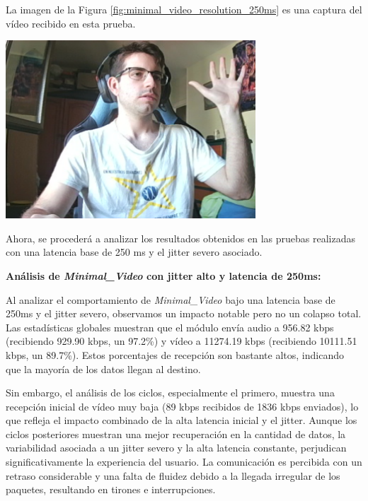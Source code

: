 \newpage
La imagen de la Figura \ref{fig:minimal_video_resolution_250ms} es una captura del vídeo recibido en esta prueba.
\begin{center}
  \includegraphics[width = 0.7\textwidth]{images/VideoRecibido6.3.png}
  \label{fig:minimal_video_resolution_250ms}
\end{center}
\newpage


Ahora, se procederá a analizar los resultados obtenidos en las pruebas realizadas con una latencia base de 250 ms y el jitter severo asociado.
\vspace{\baselineskip}

\textbf{Análisis de \textit{Minimal\_Video} con jitter alto y latencia de 250ms:}
\vspace{\baselineskip}

Al analizar el comportamiento de \textit{Minimal\_Video} bajo una latencia base de 250ms y el jitter severo, observamos un impacto notable pero no un colapso total. Las estadísticas globales muestran que el módulo envía audio a 956.82 kbps (recibiendo 929.90 kbps, un 97.2\%) y vídeo a 11274.19 kbps (recibiendo 10111.51 kbps, un 89.7\%). Estos porcentajes de recepción son bastante altos, indicando que la mayoría de los datos llegan al destino.
\vspace{\baselineskip}

Sin embargo, el análisis de los ciclos, especialmente el primero, muestra una recepción inicial de vídeo muy baja (89 kbps recibidos de 1836 kbps enviados), lo que refleja el impacto combinado de la alta latencia inicial y el jitter. Aunque los ciclos posteriores muestran una mejor recuperación en la cantidad de datos, la variabilidad asociada a un jitter severo y la alta latencia constante, perjudican significativamente la experiencia del usuario. La comunicación es percibida con un retraso considerable y una falta de fluidez debido a la llegada irregular de los paquetes, resultando en tirones e interrupciones.

